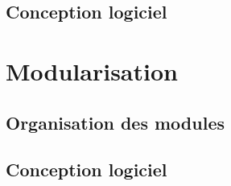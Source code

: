 \documentclass[a4paper,12pt]{article}
\begin{document}
\clearpage
\subsection{Conception logiciel}




\section{Modularisation}
\label{sec:module}

\subsection{Organisation des modules}

\clearpage
\subsection{Conception logiciel}


%
\end{document}
